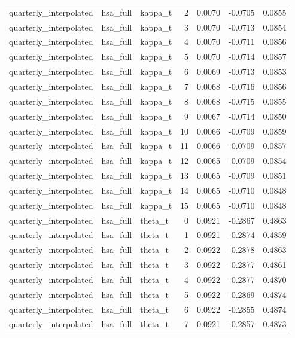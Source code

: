 \begin{tabular}{lllrrrr}
quarterly\_interpolated & hsa\_full & kappa\_t & 2 & 0.0070 & -0.0705 & 0.0855 \\
quarterly\_interpolated & hsa\_full & kappa\_t & 3 & 0.0070 & -0.0713 & 0.0854 \\
quarterly\_interpolated & hsa\_full & kappa\_t & 4 & 0.0070 & -0.0711 & 0.0856 \\
quarterly\_interpolated & hsa\_full & kappa\_t & 5 & 0.0070 & -0.0714 & 0.0857 \\
quarterly\_interpolated & hsa\_full & kappa\_t & 6 & 0.0069 & -0.0713 & 0.0853 \\
quarterly\_interpolated & hsa\_full & kappa\_t & 7 & 0.0068 & -0.0716 & 0.0856 \\
quarterly\_interpolated & hsa\_full & kappa\_t & 8 & 0.0068 & -0.0715 & 0.0855 \\
quarterly\_interpolated & hsa\_full & kappa\_t & 9 & 0.0067 & -0.0714 & 0.0850 \\
quarterly\_interpolated & hsa\_full & kappa\_t & 10 & 0.0066 & -0.0709 & 0.0859 \\
quarterly\_interpolated & hsa\_full & kappa\_t & 11 & 0.0066 & -0.0709 & 0.0857 \\
quarterly\_interpolated & hsa\_full & kappa\_t & 12 & 0.0065 & -0.0709 & 0.0854 \\
quarterly\_interpolated & hsa\_full & kappa\_t & 13 & 0.0065 & -0.0709 & 0.0851 \\
quarterly\_interpolated & hsa\_full & kappa\_t & 14 & 0.0065 & -0.0710 & 0.0848 \\
quarterly\_interpolated & hsa\_full & kappa\_t & 15 & 0.0065 & -0.0710 & 0.0848 \\
quarterly\_interpolated & hsa\_full & theta\_t & 0 & 0.0921 & -0.2867 & 0.4863 \\
quarterly\_interpolated & hsa\_full & theta\_t & 1 & 0.0921 & -0.2874 & 0.4859 \\
quarterly\_interpolated & hsa\_full & theta\_t & 2 & 0.0922 & -0.2878 & 0.4863 \\
quarterly\_interpolated & hsa\_full & theta\_t & 3 & 0.0922 & -0.2877 & 0.4861 \\
quarterly\_interpolated & hsa\_full & theta\_t & 4 & 0.0922 & -0.2877 & 0.4870 \\
quarterly\_interpolated & hsa\_full & theta\_t & 5 & 0.0922 & -0.2869 & 0.4874 \\
quarterly\_interpolated & hsa\_full & theta\_t & 6 & 0.0922 & -0.2855 & 0.4874 \\
quarterly\_interpolated & hsa\_full & theta\_t & 7 & 0.0921 & -0.2857 & 0.4873 \\

\end{tabular}
